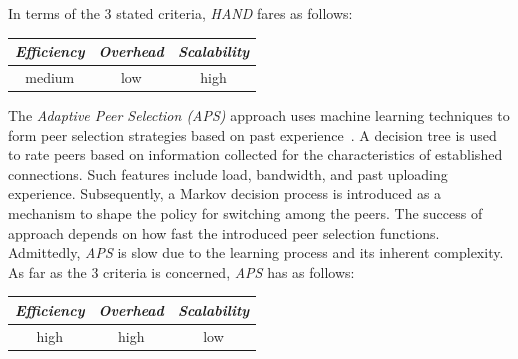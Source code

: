 %
%
In terms of the $3$ stated criteria, \emph{HAND} fares as follows:
\begin{center}
{\footnotesize
\begin{tabular}{ccc}
\emph{Efficiency} & \emph{Overhead} & \emph{Scalability} \\
\hline
medium &
low &
high
\end{tabular}
}
\end{center}

The \emph{Adaptive Peer Selection (APS)} approach uses 
machine learning techniques to form peer
selection strategies based on past experience~\cite{BFLZ2003}. 
A decision tree is used to rate peers based on information 
collected for the characteristics of established connections.
Such features include load, bandwidth, and past uploading experience. 
Subsequently, a Markov decision process is introduced 
as a mechanism to shape the policy
for switching among the peers. 
The success of approach depends on how fast the introduced 
peer selection functions. Admittedly, \emph{APS} is slow 
due to the learning process and its inherent complexity.
As far as the $3$ criteria is concerned, \emph{APS} has as follows:
\begin{center}
{\footnotesize
\begin{tabular}{ccc}
\emph{Efficiency} & \emph{Overhead} & \emph{Scalability} \\
\hline
high &
high &
%
low
\end{tabular}
}
\end{center}

